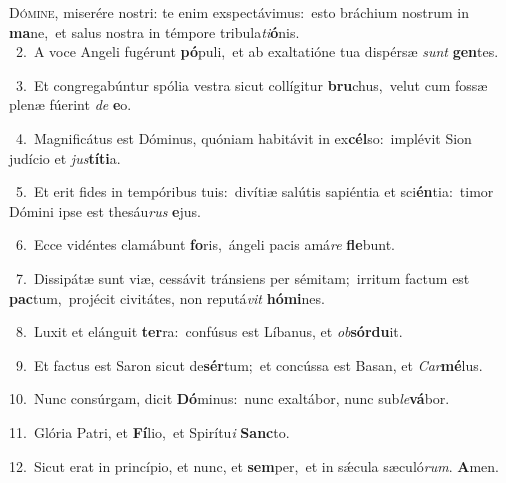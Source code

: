 \lettrine{\initial\textcolor{\initialcolor}{D}}{ómine,} miserére nostri: te enim exspectávimus:~\dagger esto bráchium nostrum in \textbf{ma}\-ne,~\star et salus nostra in témpore tribula\-\textit{ti}\-\textbf{ó}nis.\\
{\numbfont\textcolor{\numbcolor}{~2.}}~A voce Angeli fugérunt \textbf{pó}\-puli,~\star et ab exaltatióne tua dispérsæ \textit{sunt} \textbf{gen}\-tes.\par
{\numbfont\textcolor{\numbcolor}{~3.}}~Et congregabúntur spólia vestra sicut collígitur \textbf{bru}\-chus,~\star velut cum fossæ plenæ fúerint \textit{de} \textbf{e}\-o.\par
{\numbfont\textcolor{\numbcolor}{~4.}}~Magnificátus est Dóminus, quóniam habitávit in ex\-\textbf{cél}\-so:~\star implévit Sion judício et \textit{jus}\-\textbf{tí}\textbf{ti}a.\par
{\numbfont\textcolor{\numbcolor}{~5.}}~Et erit fides in tempóribus tuis:~\dagger divítiæ salútis sapiéntia et sci\-\textbf{én}\-tia:~\star timor Dómini ipse est thesáu\textit{rus} \textbf{e}\-jus.\par
{\numbfont\textcolor{\numbcolor}{~6.}}~Ecce vidéntes clamábunt \textbf{fo}\-ris,~\star ángeli pacis amá\textit{re} \textbf{fle}\-bunt.\par
{\numbfont\textcolor{\numbcolor}{~7.}}~Dissipátæ sunt viæ, cessávit tránsiens per sémitam;~\dagger irritum factum est \textbf{pac}\-tum,~\star projécit civitátes, non reputá\textit{vit} \textbf{hó}\-\textbf{mi}nes.\par
{\numbfont\textcolor{\numbcolor}{~8.}}~Luxit et elánguit \textbf{ter}\-ra:~\star confúsus est Líbanus, et \textit{ob}\-\textbf{sór}\textbf{du}it.\par
{\numbfont\textcolor{\numbcolor}{~9.}}~Et factus est Saron sicut de\-\textbf{sér}\-tum;~\star et concússa est Basan, et \textit{Car}\-\textbf{mé}lus.\par
{\numbfont\textcolor{\numbcolor}{10.}}~Nunc consúrgam, dicit \textbf{Dó}\-minus:~\star nunc exaltábor, nunc sub\-\textit{le}\-\textbf{vá}bor.\par
{\numbfont\textcolor{\numbcolor}{11.}}~Glória Patri, et \textbf{Fí}\-lio,~\star et Spirítu\textit{i} \textbf{Sanc}\-to.\par
{\numbfont\textcolor{\numbcolor}{12.}}~Sicut erat in princípio, et nunc, et \textbf{sem}\-per,~\star et in sǽcula sæculó\-\textit{rum}\-. \textbf{A}\-men.\par
